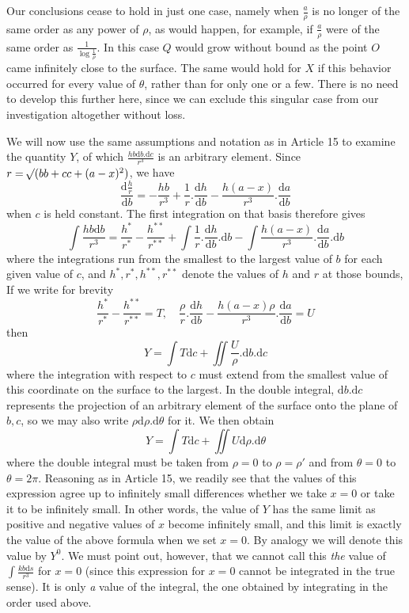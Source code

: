 Our conclusions cease to hold in just one case, namely when $\frac a\rho$ is no longer of the same order as any power of $\rho$, as would happen, for example, if $\frac a\rho$ were of the same order as $\frac{1}{\log\frac1\rho}$. In this case $Q$ would grow without bound as the point $O$ came infinitely close to the surface. The same would hold for $X$ if this behavior occurred for every value of $\theta$, rather than for only one or a few. There is no need to develop this further here, since we can exclude this singular case from our investigation altogether without loss.

We will now use the same assumptions and notation as in Article 15 to examine the quantity $Y$, of which $\frac{hb\mathrm db.\mathrm dc}{r^3}$ is an arbitrary element. Since $r=\mathord{{}^{}\!\surd}(bb+cc+(a-x)^2)$, we have
\[
\frac{\mathrm d\frac hr}{\mathrm db}=-\frac{hb}{r^3}+\frac1r.\frac{\mathrm dh}{\mathrm db}-\frac{h(a-x)}{r^3}.\frac{\mathrm da}{\mathrm db}
\]
when $c$ is held constant. The first integration on that basis therefore gives
\[
\int\frac{hb\mathrm db}{r^3}=\frac{h^*}{r^*}-\frac{h^{**}}{r^{**}}+\int\frac1r.\frac{\mathrm dh}{\mathrm db}.\mathrm db-\int\frac{h(a-x)}{r^3}.\frac{\mathrm da}{\mathrm db}.\mathrm db
\]
where the integrations run from the smallest to the largest value of $b$ for each given value of $c$, and $h^*,r^*,h^{**},r^{**}$ denote the values of $h$ and $r$ at those bounds, If we write for brevity
\[
\frac{h^*}{r^*}-\frac{h^{**}}{r^{**}}=T,\quad\frac\rho r.\frac{\mathrm dh}{\mathrm db}-\frac{h(a-x)\rho}{r^3}.\frac{\mathrm da}{\mathrm db}=U
\]
then
\[
Y=\int T\mathrm dc+\iint\frac U\rho.\mathrm db.\mathrm dc
\]
%
where the integration with respect to $c$ must extend from the smallest value of this coordinate on the surface to the largest. In the double integral, $\mathrm db.\mathrm dc$ represents the projection of an arbitrary element of the surface onto the plane of $b,c$, so we may also write $\rho\mathrm d\rho.\mathrm d\theta$ for it. We then obtain
\[
Y=\int T\mathrm dc+\iint U\mathrm d\rho.\mathrm d\theta
\]
where the double integral must be taken from $\rho=0$ to $\rho=\rho'$ and from $\theta=0$ to $\theta=2\pi$. Reasoning as in Article 15, we readily see that the values of this expression agree up to infinitely small differences whether we take $x=0$ or take it to be infinitely small. In other words, the value of $Y$ has the same limit as positive and negative values of $x$ become infinitely small, and this limit is exactly the value of the above formula when we set $x=0$. By analogy we will denote this value by $Y^0$. We must point out, however, that we cannot call this \textit{the} value of $\int\frac{kb\mathrm ds}{r^3}$ for $x=0$ (since this expression for $x=0$ cannot be integrated in the true sense). It is only \textit{a} value of the integral, the one obtained by integrating in the order used above.

